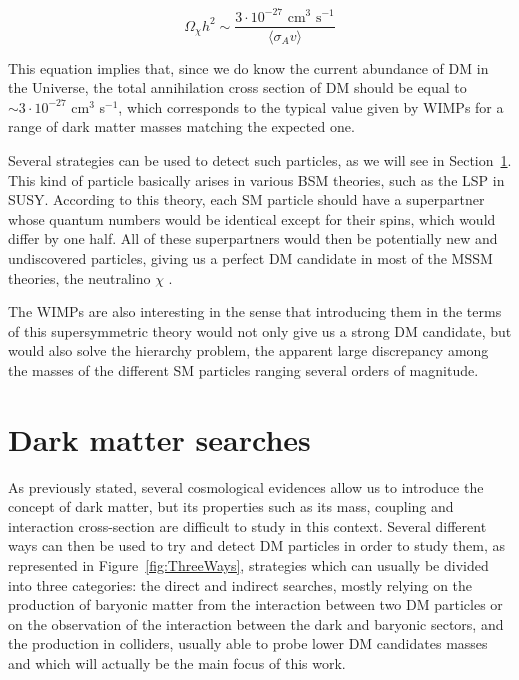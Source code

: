 \documentclass[a4paper, 10pt, openright]{report}
\begin{document}
\begin{equation}
\label{eq:Annihilation}
\Omega_\chi h^2 \sim \frac{3 \cdot 10^{-27} \text{ cm}^3 \text{ s}^{-1}}{\langle \sigma_A v \rangle}
\end{equation}

This equation implies that, since we do know the current abundance of \ac{DM} in the Universe, the total annihilation cross section of \ac{DM} should be equal to $\sim 3 \cdot 10^{-27} $ cm$^3 $ s$^{-1}$, which corresponds to the typical value given by \acp{WIMP} for a range of dark matter masses matching the expected one.

Several strategies can be used to detect such particles, as we will see in Section~\ref{section:DMSearches}. This kind of particle basically arises in various \ac{BSM} theories, such as the \ac{LSP} in SUSY. According to this theory, each \ac{SM} particle should have a superpartner whose quantum numbers would be identical except for their spins, which would differ by one half. All of these superpartners would then be potentially new and undiscovered particles, giving us a perfect \ac{DM} candidate in most of the \ac{MSSM} theories, the neutralino $\chi$ \cite{MSSM}.

The \acp{WIMP} are also interesting in the sense that introducing them in the terms of this supersymmetric theory would not only give us a strong \ac{DM} candidate, but would also solve the hierarchy problem, the apparent large discrepancy among the masses of the different \ac{SM} particles ranging several orders of magnitude.

\section{Dark matter searches} \label{section:DMSearches}

As previously stated, several cosmological evidences allow us to introduce the concept of dark matter, but its properties such as its mass, coupling and interaction cross-section are difficult to study in this context. Several different ways can then be used to try and detect \ac{DM} particles in order to study them, as represented in Figure~\ref{fig:ThreeWays}, strategies which can usually be divided into three categories: the direct and indirect searches, mostly relying on the production of baryonic matter from the interaction between two \ac{DM} particles or on the observation of the interaction between the dark and baryonic sectors, and the production in colliders, usually able to probe lower \ac{DM} candidates masses and which will actually be the main focus of this work. 
\end{document}
